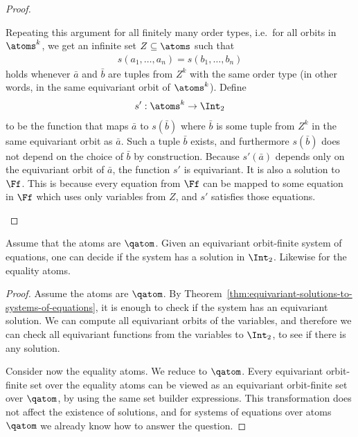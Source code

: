 \begin{proof}
\begin{enumerate}
Repeating this argument for all finitely many order types, i.e.~for all orbits in $\atoms^k$, we get an infinite set $Z \subseteq \atoms$ such that 
\begin{align*}
 s(a_1,\ldots,a_n) = s(b_1,\ldots,b_n) 
\end{align*}
holds whenever $\bar a$ and $\bar b$ are tuples from $Z^k$ with the same order type (in other words, in the same equivariant orbit of $\atoms^k$). Define 
\begin{align*}
 s' : \atoms^k \to \Int_2
\end{align*}
to be the function that maps $\bar a$ to $s(\bar b)$ where $\bar b$ is some tuple from $Z^k$ in the same equivariant orbit as $\bar a$. Such a tuple $\bar b$ exists, and furthermore $s(\bar b)$ does not depend on the choice of $\bar b$ by construction. Because $s'(\bar a)$ depends only on the equivariant orbit of $\bar a$, the function $s'$ is equivariant. It is also a solution to $\Ff$. This is because every equation from $\Ff$ can be mapped to some equation in $\Ff$ which uses only variables from $Z$, and $s'$ satisfies those equations. 
 \end{enumerate}
 
\end{proof}


\begin{corollary}
 Assume that the atoms are $\qatom$. Given an equivariant orbit-finite system of equations, one can decide if the system has a solution in $\Int_2$. Likewise for the equality atoms. 
\end{corollary}
\begin{proof}
 Assume the atoms are $\qatom$. 
 By Theorem~\ref{thm:equivariant-solutions-to-systems-of-equations}, it is enough to check if the system has an equivariant solution. We can compute all equivariant orbits of the variables, and therefore we can check all equivariant functions from the variables to $\Int_2$, to see if there is any solution.

 Consider now the equality atoms. We reduce to $\qatom$. Every equivariant orbit-finite set over the equality atoms can be viewed as an equivariant orbit-finite set over $\qatom$, by using the same set builder expressions. This transformation does not affect the existence of solutions, and for systems of equations over atoms $\qatom$ we already know how to answer the question. 
\end{proof}



